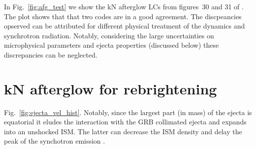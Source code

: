 In Fig.~\ref{fig:afg_test} we show the \ac{kN} afterglow \acp{LC} from 
figures~30 and 31 of \citet{Radice:2018pdn}. The plot shows that that two codes
are in a good agreement. The discpeancies opserved can be attributed for different 
physical treatment of the \blast{} dynamics and synchrotron radiation. 
Notably, considering the large uncertainties on microphysical parameters and 
ejecta properties (discussed below) these discrepancies can be neglected.



\section{\ac{kN} afterglow for \GRB{} rebrightening}


Fig.~\ref{fig:ejecta_vel_hist}. 
Notably, since the largest part (in mass) of the ejecta is equatorial it eludes the 
interaction with the \ac{GRB} collimated ejecta and expands into an unshocked \ac{ISM}.
The latter can decrease the \ac{ISM} density and delay the peak of the 
synchotron emission \citep{2020MNRAS.495.4981M}.



